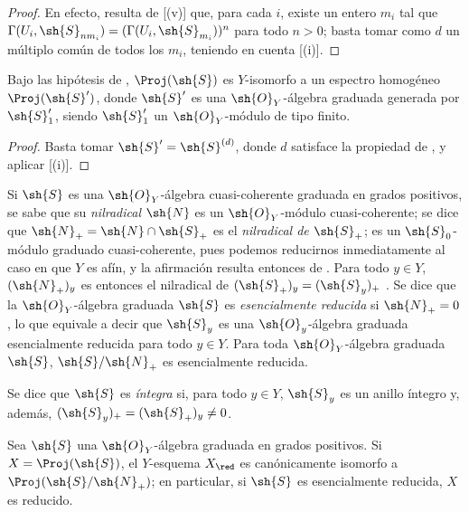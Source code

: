 \documentclass[oneside,10pt]{amsart}
\newcommand{\oldpage}[2][]{\marginnote{\normalfont\footnotesize\textbf{#1}~|~#2}\ignorespaces}
\let\EGAOriginalLabel\label
\renewcommand{\label}[1]{\phantomsection\EGAOriginalLabel{#1}}
\begin{document}
\begin{proof}
En efecto, resulta de [(v)] que, para cada $i$, existe un entero $m_i$ tal que $\Gamma(U_i,\sh{S}_{nm_i})=(\Gamma(U_i,\sh{S}_{m_i}))^n$ para todo $n>0$; basta tomar como $d$ un múltiplo común de todos los $m_i$, teniendo en cuenta [(i)].
\end{proof}

\begin{corollary}[3.1.11]
\label{II.3.1.11}
Bajo las hipótesis de , $\Proj(\sh{S})$ es $Y$-isomorfo a un espectro homogéneo $\Proj(\sh{S}')$, donde $\sh{S}'$ es una $\sh{O}_Y$-álgebra graduada generada por $\sh{S}'_1$, siendo $\sh{S}'_1$ un $\sh{O}_Y$-módulo de tipo finito.
\end{corollary}

\begin{proof}
Basta tomar $\sh{S}'=\sh{S}^{(d)}$, donde $d$ satisface la propiedad de , y aplicar [(i)].
\end{proof}

\begin{env}[3.1.12]
\label{II.3.1.12}
Si $\sh{S}$ es una $\sh{O}_Y$-álgebra cuasi-coherente graduada en grados positivos, se sabe  que su \emph{nilradical} $\sh{N}$ es un $\sh{O}_Y$-módulo cuasi-coherente; se dice que $\sh{N}_+=\sh{N}\cap\sh{S}_+$ es el \emph{nilradical de $\sh{S}_+$}; es un $\sh{S}_0$-módulo graduado cuasi-coherente, pues podemos reducirnos inmediatamente al caso en que $Y$ es afín, y la afirmación resulta entonces de .
Para todo $y\in Y$, $(\sh{N}_+)_y$ es entonces el nilradical de $(\sh{S}_+)_y=(\sh{S}_y)_+$ .
Se dice que la $\sh{O}_Y$-álgebra graduada $\sh{S}$ es \emph{esencialmente reducida} si $\sh{N}_+=0$, lo que equivale
\oldpage[II]{53}
a decir que $\sh{S}_y$ es una $\sh{O}_y$-álgebra graduada esencialmente reducida para todo $y\in Y$.
Para toda $\sh{O}_Y$-álgebra graduada $\sh{S}$, $\sh{S}/\sh{N}_+$ es esencialmente reducida.

Se dice que $\sh{S}$ es \emph{íntegra} si, para todo $y\in Y$, $\sh{S}_y$ es un anillo íntegro y, además, $(\sh{S}_y)_+=(\sh{S}_+)_y\neq0$.
\end{env}

\begin{proposition}[3.1.13]
\label{II.3.1.13}
Sea $\sh{S}$ una $\sh{O}_Y$-álgebra graduada en grados positivos.
Si $X=\Proj(\sh{S})$, el $Y$-esquema $X_\red$ es canónicamente isomorfo a $\Proj(\sh{S}/\sh{N}_+)$; en particular, si $\sh{S}$ es esencialmente reducida, $X$ es reducido.
\end{proposition}
\end{document}
